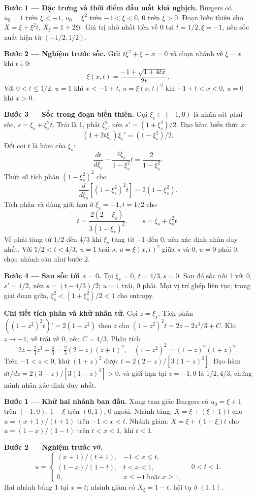 \textbf{Bước 1 — Đặc trưng và thời điểm đầu mất khả nghịch.} Burgers có $u_0=1$ trên $\xi<-1$, $u_0=\xi^2$ trên $-1<\xi<0$, 0 trên $\xi>0$. Đoạn biến thiên cho $X=\xi+\xi^2t$, $X_\xi=1+2\xi t$. Giá trị nhỏ nhất tiến về 0 tại $t=1/2,\xi=-1$, nên sốc xuất hiện từ $(-1/2,1/2)$.

\textbf{Bước 2 — Nghiệm trước sốc.} Giải $t\xi^2+\xi-x=0$ và chọn nhánh về $\xi=x$ khi $t\downarrow0$:
\[\xi(x,t)=\frac{-1+\sqrt{1+4tx}}{2t}.\]
Với $0<t\le1/2$, $u=1$ khi $x<-1+t$, $u=\xi(x,t)^2$ khi $-1+t<x<0$, $u=0$ khi $x>0$.

\textbf{Bước 3 — Sốc trong đoạn biến thiên.} Gọi $\xi_s\in(-1,0)$ là nhãn sát phải sốc, $s=\xi_s+\xi_s^2t$. Trái là 1, phải $\xi_s^2$, nên $s'=(1+\xi_s^2)/2$. Đạo hàm biểu thức $s$:
\[(1+2t\xi_s)\xi_s'=(1-\xi_s^2)/2.\]
Đổi coi $t$ là hàm của $\xi_s$:
\[\frac{dt}{d\xi_s}-\frac{4\xi_s}{1-\xi_s^2}t=\frac2{1-\xi_s^2}.\]
Thừa số tích phân $(1-\xi_s^2)^2$ cho
\[\frac{d}{d\xi_s}[(1-\xi_s^2)^2t]=2(1-\xi_s^2).\]
Tích phân và dùng giới hạn ở $\xi_s=-1,t=1/2$ cho
\[t=\frac{2(2-\xi_s)}{3(1-\xi_s)^2},\qquad s=\xi_s+\xi_s^2t.\]
Vế phải tăng từ $1/2$ đến $4/3$ khi $\xi_s$ tăng từ $-1$ đến 0, nên xác định nhãn duy nhất. Với $1/2<t<4/3$, $u=1$ trái $s$, $u=\xi(x,t)^2$ giữa $s$ và 0, $u=0$ phải 0; chọn nhánh căn như bước 2.

\textbf{Bước 4 — Sau sốc tới $x=0$.} Tại $\xi_s=0$, $t=4/3,s=0$. Sau đó sốc nối 1 với 0, $s' =1/2$, nên $s=(t-4/3)/2$; $u=1$ trái, 0 phải. Mọi vị trí ghép liên tục; trong giai đoạn giữa, $\xi_s^2<(1+\xi_s^2)/2<1$ cho entropy.

\textbf{Chi tiết tích phân và khử nhân tử.} Gọi $z=\xi_s$. Tích phân $( (1-z^2)^2t)'=2(1-z^2)$ theo $z$ cho $(1-z^2)^2t=2z-2z^3/3+C$. Khi $z\to-1$, vế trái về $0$, nên $C=4/3$. Phân tích
\[2z-\tfrac23z^3+\tfrac43=\tfrac23(2-z)(z+1)^2,\quad
(1-z^2)^2=(1-z)^2(1+z)^2.\]
Trên $-1<z<0$, khử $(1+z)^2$ được $t=2(2-z)/[3(1-z)^2]$. Đạo hàm $dt/dz=2(3-z)/[3(1-z)^3]>0$, và giới hạn tại $z=-1,0$ là $1/2,4/3$, chứng minh nhãn xác định duy nhất.

\textbf{Bước 1 — Khử hai nhánh ban đầu.} Xung tam giác Burgers có $u_0=\xi+1$ trên $(-1,0)$, $1-\xi$ trên $(0,1)$, 0 ngoài. Nhánh tăng: $X=\xi+(\xi+1)t$ cho $u=(x+1)/(t+1)$ trên $-1<x<t$. Nhánh giảm: $X=\xi+(1-\xi)t$ cho $u=(1-x)/(1-t)$ trên $t<x<1$, khi $t<1$.

\textbf{Bước 2 — Nghiệm trước vỡ.}
\[u=\begin{cases}(x+1)/(t+1),&-1<x\le t,\\(1-x)/(1-t),&t<x<1,\\0,&x\le-1\ \text{hoặc}\ x\ge1,\end{cases}\quad0<t<1.\]
Hai nhánh bằng 1 tại $x=t$; nhánh giảm có $X_\xi=1-t$, hội tụ ở $(1,1)$.

